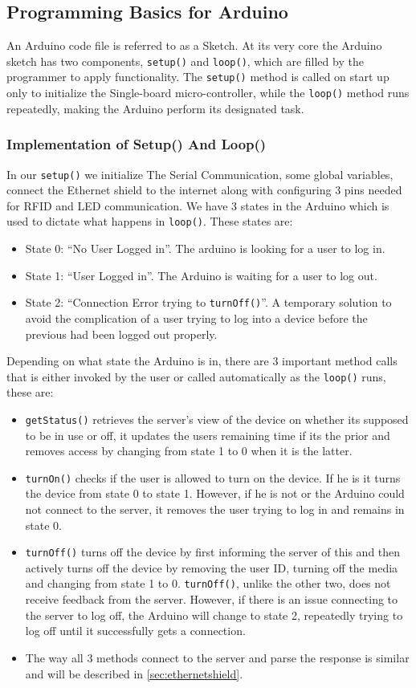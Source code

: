 \subsection{Programming Basics for Arduino}

An Arduino code file is referred to as a Sketch. At its very core the Arduino sketch has two components, \verb|setup()| and \verb|loop()|, which are filled by the programmer to apply functionality.
The \verb|setup()| method is called on start up only to initialize the Single-board micro-controller, while the \verb|loop()| method runs repeatedly, making the Arduino perform its designated task.

\subsubsection*{Implementation of Setup() And Loop()}
In our \verb|setup()| we initialize The Serial Communication, some global variables, connect the Ethernet shield to the internet along with configuring 3 pins needed for RFID and LED communication.\newline
We have 3 states in the Arduino which is used to dictate what happens in \verb|loop()|. These states are:
\begin{itemize}
	\item State 0: ``No User Logged in''. The arduino is looking for a user to log in.
	\item State 1: ``User Logged in''. The Arduino is waiting for a user to log out.
	\item State 2: ``Connection Error trying to \verb|turnOff()|''. A temporary solution to avoid the complication of a user trying to log into a device before the previous had been logged out properly.
\end{itemize}
Depending on what state the Arduino is in, there are 3 important method calls that is either invoked by the user or called automatically as the \verb|loop()| runs, these are:
\begin{itemize}
	\item \verb|getStatus()| retrieves the server's view of the device on whether its supposed to be in use or off, it updates the users remaining time if its the prior and removes access by changing from state 1 to 0 when it is the latter.
	\item \verb|turnOn()| checks if the user is allowed to turn on the device. If he is it turns the device from state 0 to state 1. However, if he is not or the Arduino could not connect to the server, it removes the user trying to log in and remains in state 0.
	\item \verb|turnOff()| turns off the device by first informing the server of this and then actively turns off the device by removing the user ID, turning off the media and changing from state 1 to 0. \verb|turnOff()|, unlike the other two, does not receive feedback from the server. However, if there is an issue connecting to the server to log off, the Arduino will change to state 2, repeatedly trying to log off until it successfully gets a connection.
	\item The way all 3 methods connect to the server and parse the response is similar and will be described in \autoref{sec:ethernetshield}.
\end{itemize}
